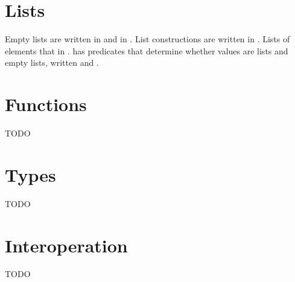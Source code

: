 \section{Lists}

Empty lists are written \expnils{\varty} in \thehaskellml and \expnild in \thescheme. List constructions are written \expcons{\varexp}{\varexp} in \thehaskellmlscheme. Lists of elements that \havetype{\varty} in \thehaskellml \havetype{\tylist{\varty}}. \Thescheme has predicates that determine whether values are lists and empty lists, written \expplist{\varexp} and \exppnull{\varexp}.

\section{Functions}

TODO

\section{Types}

TODO

\section{Interoperation}

TODO

\clearpage



\clearpage



\clearpage



\clearpage



\clearpage



\clearpage



\clearpage



\clearpage



\clearpage



